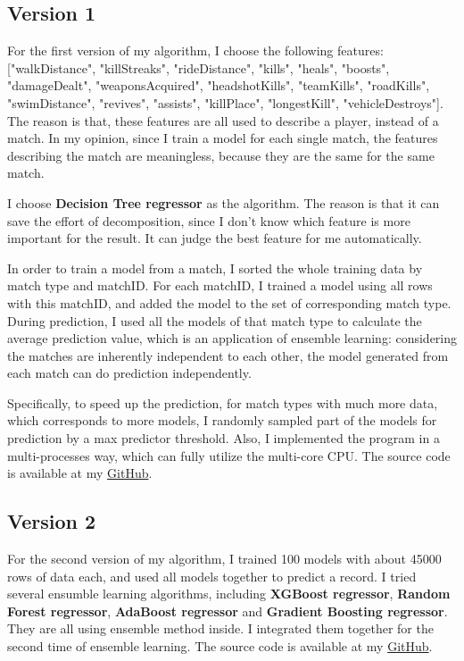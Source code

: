 \documentclass[journal=jacsat,manuscript=article]{achemso}
\begin{document}
\subsection{Version 1}

For the first version of my algorithm, I choose the following features: ["walkDistance",
"killStreaks", "rideDistance", "kills", "heals", "boosts", "damageDealt", "weaponsAcquired",
"headshotKills", "teamKills", "roadKills", "swimDistance", "revives", "assists", "killPlace",
"longestKill", "vehicleDestroys"]. The reason is that, these features are all used to describe a 
player, instead of a match. In my opinion, since I train a model for each single match,
the features describing the match are meaningless, because they are the same for the same match.

I choose \textbf{Decision Tree regressor} as the algorithm. The reason is that it can 
save the effort of decomposition, since I don't know which feature is more important for 
the result. It can judge the best feature for me automatically.

In order to train a model from a match, I sorted the whole training data by match type and matchID.
For each matchID, I trained a model using all rows with this matchID, and added the model to the 
set of corresponding match type. During prediction, I used all the models of that match type 
to calculate the average prediction value, which is an application of ensemble learning: considering
the matches are inherently independent to each other, the model generated from each match 
can do prediction independently.

Specifically, to speed up the prediction, for match types with much more data, which corresponds
to more models, I randomly sampled part of the models for prediction by a max predictor threshold.
Also, I implemented the program in a multi-processes way, 
which can fully utilize the multi-core CPU. The source code is available at my
\href{https://github.com/mrdrivingduck/pugb-finish-placement-prediction/blob/master/src/main_multi_process_version.py}{GitHub}.

\subsection{Version 2}

For the second version of my algorithm, I trained 100 models with about 45000 rows of data each,
and used all models together to predict a record. I tried several ensumble learning algorithms,
including \textbf{XGBoost regressor}, \textbf{Random Forest regressor}, \textbf{AdaBoost regressor}
and \textbf{Gradient Boosting regressor}. They are all using ensemble method inside.
I integrated them together for the second time of ensemble learning.
The source code is available at my
\href{https://github.com/mrdrivingduck/pugb-finish-placement-prediction/blob/master/src/main_ensemble.py}{GitHub}.
\end{document}
